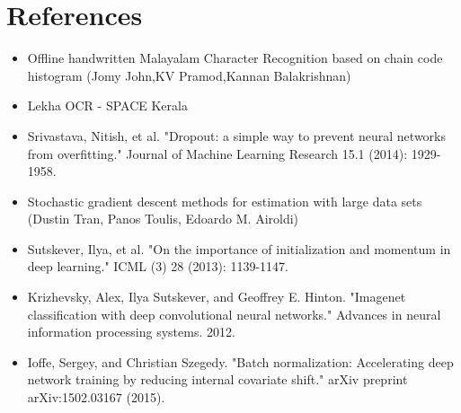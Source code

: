 \documentclass[12pt]{report}
\begin{document}
\section*{References}
\begin{itemize}
\item Offline handwritten Malayalam Character Recognition based on chain code histogram (Jomy John,KV Pramod,Kannan Balakrishnan)
\item Lekha OCR - SPACE Kerala
\item Srivastava, Nitish, et al. "Dropout: a simple way to prevent neural networks from overfitting." Journal of Machine Learning Research 15.1 (2014): 1929-1958.
\item Stochastic gradient descent methods for estimation with large data sets (Dustin Tran, Panos Toulis, Edoardo M. Airoldi)
\item Sutskever, Ilya, et al. "On the importance of initialization and momentum in deep learning." ICML (3) 28 (2013): 1139-1147.
\item Krizhevsky, Alex, Ilya Sutskever, and Geoffrey E. Hinton. "Imagenet classification with deep convolutional neural networks." Advances in neural information processing systems. 2012.
\item Ioffe, Sergey, and Christian Szegedy. "Batch normalization: Accelerating deep network training by reducing internal covariate shift." arXiv preprint arXiv:1502.03167 (2015). 

\end{itemize}
\end{document}

